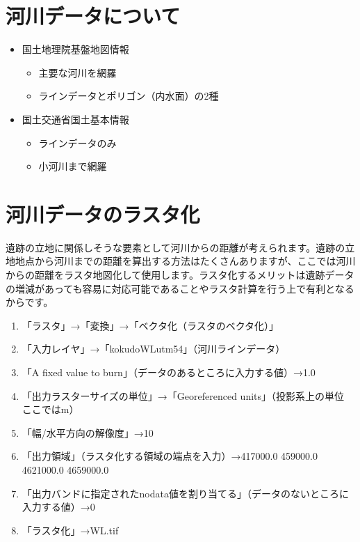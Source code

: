 \documentclass[14Q,twocolumn]{jsarticle}
\begin{document}
\section{河川データについて}
\begin{itemize}
\item 国土地理院基盤地図情報
	\begin{itemize}
	\item 主要な河川を網羅
	\item ラインデータとポリゴン（内水面）の2種
	\end{itemize}
\item 国土交通省国土基本情報
	\begin{itemize}
	\item ラインデータのみ
	\item 小河川まで網羅
	\end{itemize}
\end{itemize}

\section{河川データのラスタ化}
遺跡の立地に関係しそうな要素として河川からの距離が考えられます。遺跡の立地地点から河川までの距離を算出する方法はたくさんありますが、ここでは河川からの距離をラスタ地図化して使用します。ラスタ化するメリットは遺跡データの増減があっても容易に対応可能であることやラスタ計算を行う上で有利となるからです。

\begin{enumerate}
\item 「ラスタ」→「変換」→「ベクタ化（ラスタのベクタ化）」
\item 「入力レイヤ」→「kokudoWLutm54」（河川ラインデータ）
\item 「A fixed value to burn」（データのあるところに入力する値）→1.0
\item 「出力ラスターサイズの単位」→「Georeferenced units」（投影系上の単位　ここではm）
\item 「幅/水平方向の解像度」→10
\item 「出力領域」（ラスタ化する領域の端点を入力）→417000.0 459000.0 4621000.0 4659000.0
\item 「出力バンドに指定されたnodata値を割り当てる」（データのないところに入力する値）→0
\item 「ラスタ化」→WL.tif
\end{enumerate}
\end{document}
